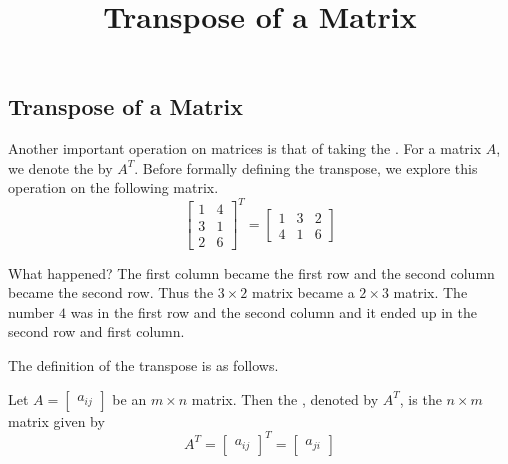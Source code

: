 \documentclass{ximera}
\title{Transpose of a Matrix} \license{CC BY-NC-SA 4.0}
\begin{document}
\begin{abstract}
  \end{abstract}
\maketitle


\begin{onlineOnly}
\section*{Transpose of a Matrix}
\end{onlineOnly}


Another important operation on matrices is that of taking the . For a matrix $A$, we denote the
 by $A^T$. Before formally defining the transpose, we explore this
operation on the following matrix.
\begin{equation*}
\begin{bmatrix}
1 & 4 \\
3 & 1 \\
2 & 6
\end{bmatrix}^{T}=
\begin{bmatrix}
1 & 3 & 2 \\
4 & 1 & 6
\end{bmatrix}
\end{equation*}

What happened? The first column became the first row and the second column
became the second row. Thus the $3\times 2$ matrix became a $2\times 3$
matrix. The number $4$ was in the first row and the second column and it
ended up in the second row and first column. 

The definition of the transpose is as follows.

\begin{definition}\label{def:matrixtranspose}
Let $A=\begin{bmatrix} a _{ij}\end{bmatrix}$ be an $m\times n$ matrix. Then the , denoted by $A^{T}$, is the $n\times m$
matrix given by 
\begin{equation*}
A^{T} = \begin{bmatrix} a _{ij}\end{bmatrix}^{T}= \begin{bmatrix} a_{ji} \end{bmatrix}
\end{equation*}
\end{definition}
\end{document}
